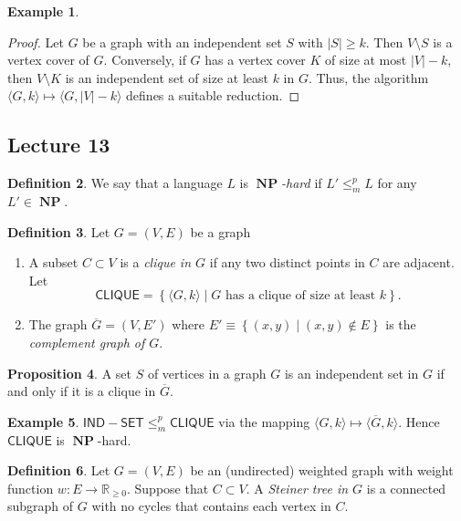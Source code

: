 \documentclass[10pt,letterpaper,cm]{nupset}
\theoremstyle{definition}
\newtheorem{definition}{Definition}[subsection]
\newtheorem{exmp}[definition]{Example}
\theoremstyle{theorem}
\newtheorem{prop}[definition]{Proposition}
\theoremstyle{remark}
\newcommand{\R}{\mathbb R}
\newcommand{\1}{\mathbf{1}}
\newcommand{\0}{\vec 0}
\DeclareMathOperator{\NP}{\mathbf{NP}}
\begin{document}
\begin{exmp}
\begin{enumerate}
\begin{proof}
Let $G$ be a graph with an independent set $S$ with $\left\lvert{S}\right\rvert\geq k$.  Then $V \setminus S$ is a vertex cover of $G$. Conversely, if $G$ has a vertex cover $K$ of size at most $\left\lvert{V}\right\rvert - k$, then $V \setminus K$ is an independent set of size at least $k$ in $G$. Thus, the algorithm $\langle G, k \rangle \mapsto \langle G, \left\lvert{V}\right\rvert - k\rangle$ defines a suitable reduction.  
\end{proof}
\end{enumerate}
\end{exmp}

\subsection{Lecture 13}

\begin{definition}
We say that a language $L$ is \textit{$\NP$-hard} if $L' \leq_m^p L$ for any $L' \in \NP$.
\end{definition}

\begin{definition} Let $G=\left(V, E\right)$ be a graph
\begin{enumerate}
\item A subset $C \subset V$ is a \textit{clique in $G$} if any two distinct points in $C$ are adjacent. Let $$\mathsf{CLIQUE}= \left\{\langle G, k \rangle \mid G \text{ has a clique of size at least }k\right\}.$$
\item The graph $\overline{G} = \left(V, E'\right)$ where $E' \equiv \left\{\left(x,y\right) \mid \left(x,y\right) \notin E\right\}$ is the  \textit{complement graph of $G$}.
\end{enumerate}
\end{definition}

\begin{prop}
 A set $S$ of vertices in a graph $G$ is an independent set in $G$ if and only if it is a clique in $\overline{G}$.
\end{prop}

\begin{exmp}
$\mathsf{IND{-}SET} \leq_m^p \mathsf{CLIQUE}$ via the mapping $\langle G, k \rangle \mapsto \langle \overline{G}, k \rangle$. Hence $\mathsf{CLIQUE}$ is $\NP$-hard.
\end{exmp}

\begin{definition}
Let $G= \left(V, E\right)$ be an (undirected) weighted graph with weight function $w : E \to \R_{\geq 0}$. Suppose that $C \subset V$. A \textit{Steiner tree in $G$} is a connected subgraph of $G$ with no cycles that contains each vertex in $C$.
\end{definition}
\end{document}
